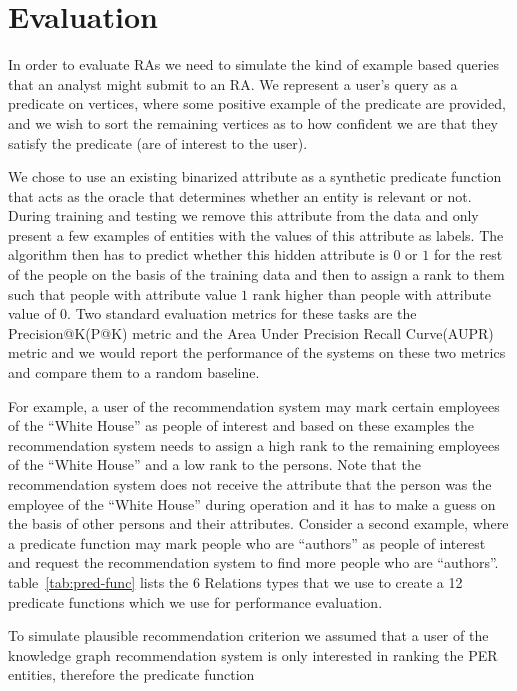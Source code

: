 \documentclass[paper=a4,fontsize=11pt]{scrartcl}
\makeatletter
\newcommand{\tabref}[1]{table~\ref{#1}}
\numberwithin{equation}{section}    %
\numberwithin{figure}{section}      %
\numberwithin{table}{section}       %
\newcommand{\PK}{P@K\xspace{}}
\makeatother
\begin{document}
\section{Evaluation}
\label{sec:evaluation}
In order to evaluate RAs we need to simulate the kind of example based queries
that an analyst might submit to an RA. We represent a user's query as a
predicate on vertices, where some positive example of the predicate are
provided, and we wish to sort the remaining vertices as to how confident we are
that they satisfy the predicate (are of interest to the user).

We chose to use an existing binarized attribute as a synthetic predicate function that
acts as the oracle that determines whether an entity is relevant or not.
During training and testing we remove this attribute from the data and
only present a few examples of entities with the values of this attribute as labels.
The algorithm then has to predict whether this hidden attribute is $0$ or $1$ for the
rest of the people on the basis of the training data and then to assign a rank to them
such that people with attribute value $1$ rank higher than people with attribute value of $0$.
Two standard evaluation metrics for these tasks are the {Precision@K}(\PK) metric and the
{Area Under Precision Recall Curve}(AUPR) metric and we would report the performance of the systems
on these two metrics and compare them to a random baseline.
\begin{example}\label{ex:eval}
    For example, a user of the recommendation system may mark certain employees of the
  ``White House'' as people of interest and based on these examples the recommendation
  system needs to assign a high rank to the remaining employees of the ``White House'' and
  a low rank to the persons. Note that the recommendation system does not receive the
  attribute that the person was the employee of the ``White House'' during operation
  and it has to make a guess on the basis of other persons and their attributes.
  Consider a second example, where a predicate function may mark people who are
  ``authors'' as people of interest and request the recommendation system to find more
  people who are ``authors''. \tabref{tab:pred-func} lists the 6 Relations types that we
  use to create a 12 predicate functions which we use for performance evaluation.
\end{example}
To simulate plausible recommendation criterion we assumed that
a user of the knowledge graph recommendation system is only
interested in ranking the \textsc{PER} entities, therefore the predicate function
\end{document}
